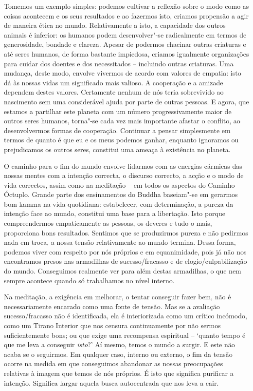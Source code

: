 Tomemos um exemplo simples: podemos cultivar a reflexão sobre o modo como as
coisas acontecem e os seus resultados e ao fazermos isto, criamos propensão a
agir de maneira ética no mundo. Relativamente a isto, a capacidade dos outros
animais é inferior: os humanos podem desenvolver"-se radicalmente em termos de
generosidade, bondade e clareza. Apesar de podermos chacinar outras criaturas e
até seres humanos, de forma bastante impiedosa, criamos igualmente organizações
para cuidar dos doentes e dos necessitados -- incluindo outras criaturas. Uma
mudança, deste modo, envolve vivermos de acordo com valores de empatia: isto dá
às nossas vidas um significado mais valioso. A cooperação e a amizade dependem
destes valores. Certamente nenhum de nós teria sobrevivido ao nascimento sem uma
considerável ajuda por parte de outras pessoas. E agora, que estamos a partilhar
este planeta com um número progressivamente maior de outros seres humanos,
torna"-se cada vez mais importante afastar o conflito, ao desenvolvermos formas
de cooperação. Continuar a pensar simplesmente em termos de quanto é que eu e os
meus podemos ganhar, enquanto ignoramos ou prejudicamos os outros seres,
constitui uma ameaça à existência no planeta.

O caminho para o fim do mundo envolve lidarmos com as energias cármicas das
nossas mentes com a intenção correcta, o discurso correcto, a acção e o modo de
vida correctos, assim como na meditação -- em todos os aspectos do Caminho
Óctuplo. Grande parte dos ensinamentos do Buddha baseiam"-se em gerarmos bom
kamma na vida quotidiana: estabelecer, com determinação, a pureza da intenção
face ao mundo, constitui uma base para a libertação. Isto porque compreendermos
empaticamente as pessoas, os deveres e tudo o mais, proporciona bons resultados.
Sentimos que se produzirmos pureza e não pedirmos nada em troca, a nossa tensão
relativamente ao mundo termina. Dessa forma, podemos viver com respeito por nós
próprios e em equanimidade, pois já não nos encontramos presos nas armadilhas de
sucesso/fracasso e de elogio/culpabilização do mundo. Conseguimos realmente ver
para além destas armadilhas, o que nem sempre acontece quando só trabalhamos no
nível interno.

Na meditação, a exigência em melhorar, o tentar conseguir fazer bem, não é
necessariamente encarado como uma fonte de tensão. Mas se a avaliação
sucesso/fracasso não é identificada, ela é interiorizada como um crítico
incómodo, como um Tirano Interior que nos censura continuamente por não sermos
suficientemente bons; ou que exige uma recompensa espiritual -- `quanto tempo é
que me leva a conseguir \emph{isto}?' Aí mesmo, temos o mundo a surgir. E este
não acaba se o seguirmos. Em qualquer caso, interno ou externo, o fim da tensão
ocorre na medida em que conseguimos abandonar as nossas preocupações relativas à
imagem que temos de nós próprios. É isto que significa purificar a intenção.
Significa largar aquela busca autocentrada que nos leva a cair.

